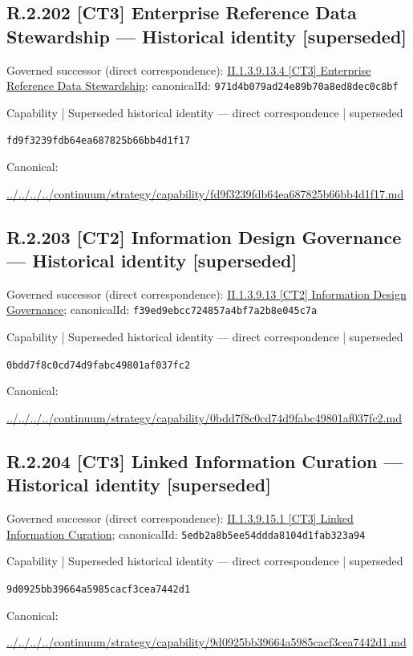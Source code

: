 \documentclass[10pt,a4paper]{article}
\begin{document}
\subsection*{R.2.202 [CT3] Enterprise Reference Data Stewardship — Historical identity [superseded]}
Governed successor (direct correspondence): \hyperref[element-971d4b079ad24e89b70a8ed8dec0c8bf]{II.1.3.9.13.4 [CT3] Enterprise Reference Data Stewardship}; canonicalId: \texttt{971d4b079ad24e89b70a8ed8dec0c8bf}\par
\label{element-fd9f3239fdb64ea687825b66bb4d1f17}
{\small Capability | Superseded historical identity — direct correspondence | superseded}\par
\texttt{fd9f3239fdb64ea687825b66bb4d1f17}\par
Canonical: \par
{\footnotesize\url{../../../../continuum/strategy/capability/fd9f3239fdb64ea687825b66bb4d1f17.md}}\par
\subsection*{R.2.203 [CT2] Information Design Governance — Historical identity [superseded]}
Governed successor (direct correspondence): \hyperref[element-f39ed9ebcc724857a4bf7a2b8e045c7a]{II.1.3.9.13 [CT2] Information Design Governance}; canonicalId: \texttt{f39ed9ebcc724857a4bf7a2b8e045c7a}\par
\label{element-0bdd7f8c0cd74d9fabc49801af037fc2}
{\small Capability | Superseded historical identity — direct correspondence | superseded}\par
\texttt{0bdd7f8c0cd74d9fabc49801af037fc2}\par
Canonical: \par
{\footnotesize\url{../../../../continuum/strategy/capability/0bdd7f8c0cd74d9fabc49801af037fc2.md}}\par
\subsection*{R.2.204 [CT3] Linked Information Curation — Historical identity [superseded]}
Governed successor (direct correspondence): \hyperref[element-5edb2a8b5ee54ddda8104d1fab323a94]{II.1.3.9.15.1 [CT3] Linked Information Curation}; canonicalId: \texttt{5edb2a8b5ee54ddda8104d1fab323a94}\par
\label{element-9d0925bb39664a5985cacf3cea7442d1}
{\small Capability | Superseded historical identity — direct correspondence | superseded}\par
\texttt{9d0925bb39664a5985cacf3cea7442d1}\par
Canonical: \par
{\footnotesize\url{../../../../continuum/strategy/capability/9d0925bb39664a5985cacf3cea7442d1.md}}\par
\end{document}
